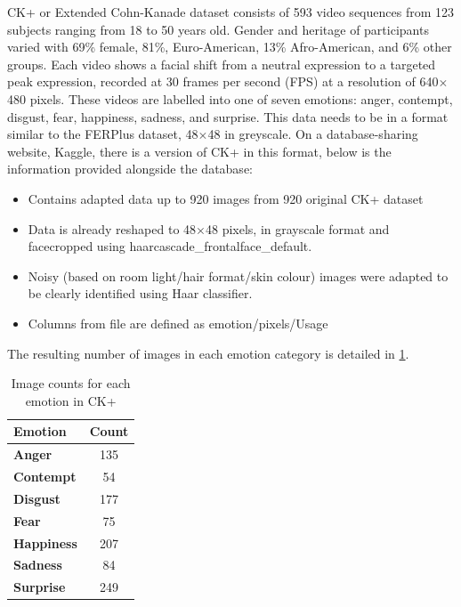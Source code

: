 CK+ or Extended Cohn-Kanade dataset consists of 593 video sequences from 123 subjects ranging from 18 to 50 years old. Gender and heritage of participants varied with 69\% female, 81\%, Euro-American, 13\% Afro-American, and 6\% other groups. Each video shows a facial shift from a neutral expression to a targeted peak expression, recorded at 30 frames per second (FPS) at a resolution of 640\(\times\)480 pixels. These videos are labelled into one of seven emotions: anger, contempt, disgust, fear, happiness, sadness, and surprise. This data needs to be in a format similar to the FERPlus dataset, 48\(\times\)48 in greyscale. On a database-sharing website, Kaggle, there is a version of CK+ in this format, below is the information provided alongside the database: 

\begin{itemize}
    \item{} Contains adapted data up to 920 images from 920 original CK+ dataset
    \item{} Data is already reshaped to 48\(\times\)48 pixels, in grayscale format and facecropped using haarcascade\_frontalface\_default.
    \item{} Noisy (based on room light/hair format/skin colour) images were adapted to be clearly identified using Haar classifier.
    \item{} Columns from file are defined as emotion/pixels/Usage
\end{itemize}

The resulting number of images in each emotion category is detailed in \ref{tab:emotion_counts_ck+}.

\begin{table}[h!]
\centering{}
\caption{Image counts for each emotion in CK+}
\begin{tabular}{|l|c|}
\hline
\textbf{Emotion}   & \textbf{Count} \\ \hline
\textbf{Anger}     & 135   \\ \hline
\textbf{Contempt}  & 54    \\ \hline
\textbf{Disgust}   & 177   \\ \hline
\textbf{Fear}      & 75    \\ \hline
\textbf{Happiness} & 207   \\ \hline
\textbf{Sadness}   & 84    \\ \hline
\textbf{Surprise}  & 249   \\ \hline
\end{tabular}
\label{tab:emotion_counts_ck+}
\end{table}

